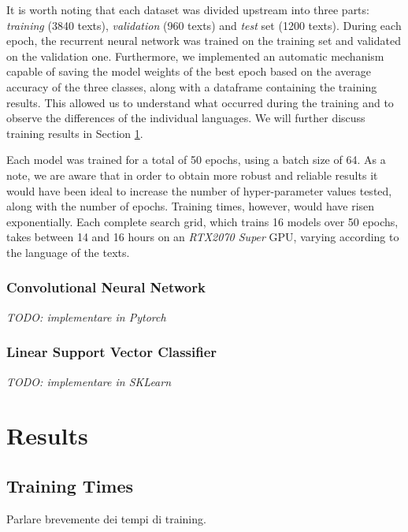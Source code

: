 \documentclass[letterpaper,11pt]{article}
\begin{document}
It is worth noting that each dataset was divided upstream into three parts: \textit{training} (3840 texts), \textit{validation} (960 texts) and \textit{test} set (1200 texts). During each epoch, the recurrent neural network was trained on the training set and validated on the validation one. Furthermore, we implemented an automatic mechanism capable of saving the model weights of the best epoch based on the average accuracy of the three classes, along with a dataframe containing the training results. This allowed us to understand what occurred during the training and to observe the differences of the individual languages. We will further discuss training results in Section \ref{sec:results}.

Each model was trained for a total of 50 epochs, using a batch size of 64. As a note, we are aware that in order to obtain more robust and reliable results it would have been ideal to increase the number of hyper-parameter values tested, along with the number of epochs. Training times, however, would have risen exponentially. Each complete search grid, which trains 16 models over 50 epochs, takes between 14 and 16 hours on an \textit{RTX2070 Super} GPU, varying according to the language of the texts.

\subsubsection*{Convolutional Neural Network}

\textit{TODO: implementare in Pytorch}

\subsubsection*{Linear Support Vector Classifier}

\textit{TODO: implementare in SKLearn}








\newpage
\section{Results}
\label{sec:results}

\subsection{Training Times}

Parlare brevemente dei tempi di training.
\end{document}
